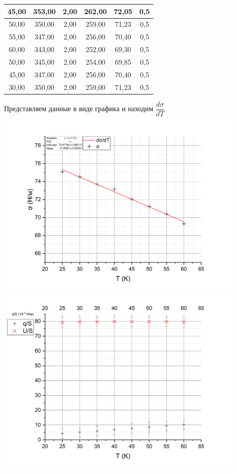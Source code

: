\documentclass[a4paper, 12pt]{article}%
\begin{document}
\begin{center}
\begin{tabular}{|c|c|c|c|c|c|}
45,00  & 353,00  & 2,00           & 262,00    & 72,05                               & 0,5                                        \\ \hline
50,00  & 350,00  & 2,00           & 259,00    & 71,23                               & 0,5                                        \\ \hline
55,00  & 347,00  & 2,00           & 256,00    & 70,40                               & 0,5                                        \\ \hline
60,00  & 343,00  & 2,00           & 252,00    & 69,30                               & 0,5                                        \\ \hline
50,00  & 345,00  & 2,00           & 254,00    & 69,85                               & 0,5                                        \\ \hline
45,00  & 347,00  & 2,00           & 256,00    & 70,40                               & 0,5                                        \\ \hline
30,00  & 350,00  & 2,00           & 259,00    & 71,23                               & 0,5                                        \\ \hline
\end{tabular}
\end{center}
\newpage
Представляем данные в виде графика и находим $\dfrac{d \sigma}{dT}$\\
\includegraphics[width = 0.9\textwidth]{251_2.jpg}\\
\includegraphics[width = 0.9\textwidth]{251_3.jpg}
\end{document}

